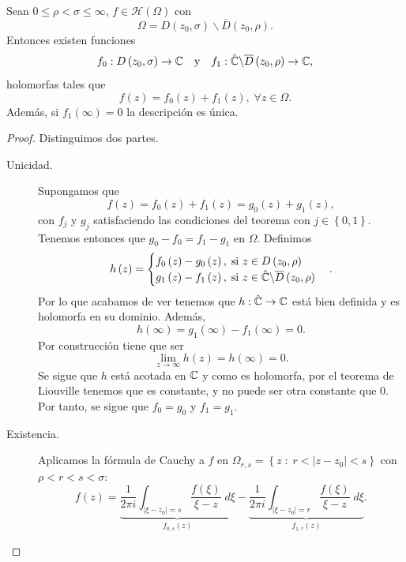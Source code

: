 \begin{theorem}
Sean $\displaystyle 0 \leq \rho < \sigma \leq \infty  $, $\displaystyle f \in \mathcal{H}\left(\Omega \right) $ con 
\[\Omega = D\left(z_{0}, \sigma \right) \backslash \overline{D}\left(z_{0}, \rho\right) .\]
Entonces existen funciones 
\[f_{0} : D\left(z_{0}, \sigma \right)\to \mathbb{C} \quad \text{y} \quad f_{1} : \hat{\mathbb{C}} \backslash \overline{D}\left(z_{0}, \rho \right)\to \mathbb{C} ,\]
holomorfas tales que 
\[f\left(z\right)=f_{0}\left(z\right) + f_{1}\left(z\right), \; \forall z \in \Omega  .\]
Además, si $\displaystyle f_{1}\left(\infty \right)=0 $ la descripción es única. 
\end{theorem}
\begin{proof}
	Distinguimos dos partes.
	\begin{description}
	\item[Unicidad.] Supongamos que 
\[f\left(z\right)=f_{0}\left(z\right)+f_{1}\left(z\right)=g_{0}\left(z\right)+g_{1}\left(z\right) ,\]
con $\displaystyle f_{j} $ y $\displaystyle g_{j} $ satisfaciendo las condiciones del teorema con $\displaystyle j \in \left\{ 0,1\right\}  $. Tenemos entonces que $\displaystyle g_{0}-f_{0}=f_{1}-g_{1} $ en $\displaystyle \Omega  $. Definimos
\[h\left(z\right)=
\begin{cases}
f_{0}\left(z\right)-g_{0}\left(z\right) , \; \text{si } z \in D\left(z_{0}, \rho \right)\\
g_{1}\left(z\right)-f_{1}\left(z\right), \; \text{si } z\in \hat{\mathbb{C} } \backslash \overline{D}\left(z_{0}, \rho \right)
\end{cases}
.\]
Por lo que acabamos de ver tenemos que $\displaystyle h: \hat{\mathbb{C}}\to \mathbb{C} $ está bien definida y es holomorfa en su dominio. Además, 
\[h\left(\infty \right)=g_{1}\left(\infty \right)-f_{1}\left(\infty \right)=0 .\]
Por construcción tiene que ser 
\[\lim_{z \to \infty }h\left(z\right)=h\left(\infty \right)=0 .\]
Se sigue que $\displaystyle h $ está acotada en $\displaystyle \mathbb{C} $ y como es holomorfa, por el teorema de Liouville tenemos que es constante, y no puede ser otra constante que 0. Por tanto, se sigue que $\displaystyle f_{0}=g_{0} $ y $\displaystyle f_{1}=g_{1} $.  
\item[Existencia.] Aplicamos la fórmula de Cauchy a $\displaystyle f $ en $\displaystyle \Omega _{r,s}= \left\{ z \; : \; r < \left|z-z_{0}\right|<s\right\}  $ con $\displaystyle \rho < r < s < \sigma  $:
\[f\left(z\right)=\underbrace{\frac{1}{2\pi i}\int _{ \left|\xi-z_{0}\right| = s}\frac{f\left(\xi\right)}{\xi - z} \; d\xi}_{f_{0,s}\left(z\right)} - \underbrace{\frac{1}{2\pi i}\int _{ \left|\xi-z_{0}\right|=r}\frac{f\left(\xi\right)}{\xi - z} \; d\xi}_{f_{1,r}\left(z\right)} .\]

\end{description}
\end{proof}
